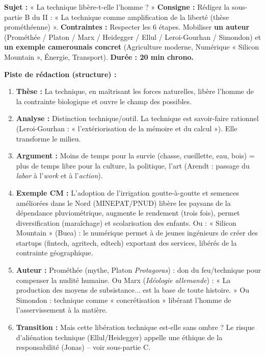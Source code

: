 \documentclass[11pt]{article}
\begin{document}
\begin{exercice}
\textbf{Sujet :} « La technique libère-t-elle l'homme ? »
\textbf{Consigne :} Rédigez la sous-partie B du II : « La technique comme amplification de la liberté (thèse prométhéenne) ».
\textbf{Contraintes :} Respecter les 6 étapes. Mobiliser \textbf{un auteur} (Prométhée / Platon / Marx / Heidegger / Ellul / Leroi-Gourhan / Simondon) et \textbf{un exemple camerounais concret} (Agriculture moderne, Numérique « Silicon Mountain », Énergie, Transport). \textbf{Durée : 20 min chrono.}
\end{exercice}

\begin{corrige}[Exercice 1]
\textbf{Piste de rédaction (structure) :}
\begin{enumerate}
    \item \textbf{Thèse :} La technique, en maîtrisant les forces naturelles, libère l'homme de la contrainte biologique et ouvre le champ des possibles.
    \item \textbf{Analyse :} Distinction technique/outil. La technique est savoir-faire rationnel (Leroi-Gourhan : « l'extériorisation de la mémoire et du calcul »). Elle transforme le milieu.
    \item \textbf{Argument :} Moins de temps pour la survie (chasse, cueillette, eau, bois) = plus de temps libre pour la culture, la politique, l'art (Arendt : passage du \emph{labor} à l'\emph{work} et à l'\emph{action}).
    \item \textbf{Exemple CM :} L'adoption de l'irrigation goutte-à-goutte et semences améliorées dans le Nord (MINEPAT/PNUD) libère les paysans de la dépendance pluviométrique, augmente le rendement (trois fois), permet diversification (maraîchage) et scolarisation des enfants. Ou : « Silicon Mountain » (Buea) : le numérique permet à de jeunes ingénieurs de créer des startups (fintech, agritech, edtech) exportant des services, libérés de la contrainte géographique.
    \item \textbf{Auteur :} Prométhée (mythe, Platon \textit{Protagoras}) : don du feu/technique pour compenser la nudité humaine. Ou Marx (\textit{Idéologie allemande}) : « La production des moyens de subsistance... est la base de toute histoire. » Ou Simondon : technique comme « concrétisation » libérant l'homme de l'asservissement à la matière.
    \item \textbf{Transition :} Mais cette libération technique est-elle sans ombre ? Le risque d'aliénation technique (Ellul/Heidegger) appelle une éthique de la responsabilité (Jonas) -- voir sous-partie C.
\end{enumerate}
\end{corrige}
\end{document}

